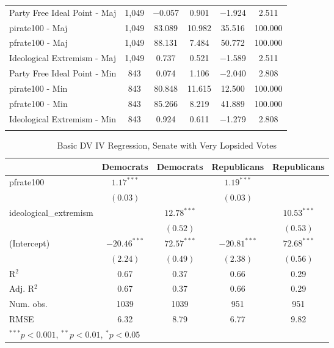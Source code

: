 \documentclass[12pt]{article}
\begin{document}
\begin{table}[!htbp]
\begin{tabular}{@{\extracolsep{5pt}}lccccc}
		\hline
		Party Free Ideal Point - Maj & 1,049 & $-$0.057 & 0.901 & $-$1.924 & 2.511 \\ 
		pirate100 - Maj & 1,049 & 83.089 & 10.982 & 35.516 & 100.000 \\ 
		pfrate100 - Maj & 1,049 & 88.131 & 7.484 & 50.772 & 100.000 \\ 
		Ideological Extremism - Maj & 1,049 & 0.737 & 0.521 & $-$1.589 & 2.511 \\ 
		\hline
		Party Free Ideal Point - Min & 843 & 0.074 & 1.106 & $-$2.040 & 2.808 \\ 
		pirate100 - Min & 843 & 80.848 & 11.615 & 12.500 & 100.000 \\ 
		pfrate100 - Min & 843 & 85.266 & 8.219 & 41.889 & 100.000 \\ 
		Ideological Extremism - Min & 843 & 0.924 & 0.611 & $-$1.279 & 2.808 \\ 
		\hline \\[-1.8ex] 
	\end{tabular} 
\end{table} 

\begin{table}
	\begin{center}
		\caption{Basic DV IV Regression, Senate with Very Lopsided Votes}
		\begin{tabular}{l c c c c }
			\hline
			& Democrats & Democrats & Republicans & Republicans \\
			\hline
			pfrate100              & $1.17^{***}$   &               & $1.19^{***}$   &               \\
			& $(0.03)$       &               & $(0.03)$       &               \\
			ideological\_extremism &                & $12.78^{***}$ &                & $10.53^{***}$ \\
			&                & $(0.52)$      &                & $(0.53)$      \\
			(Intercept)            & $-20.46^{***}$ & $72.57^{***}$ & $-20.81^{***}$ & $72.68^{***}$ \\
			& $(2.24)$       & $(0.49)$      & $(2.38)$       & $(0.56)$      \\
			\hline
			R$^2$                  & 0.67           & 0.37          & 0.66           & 0.29          \\
			Adj. R$^2$             & 0.67           & 0.37          & 0.66           & 0.29          \\
			Num. obs.              & 1039           & 1039          & 951            & 951           \\
			RMSE                   & 6.32           & 8.79          & 6.77           & 9.82          \\
			\hline
			\multicolumn{5}{l}{\scriptsize{$^{***}p<0.001$, $^{**}p<0.01$, $^*p<0.05$}}
		\end{tabular}
	\end{center}
\end{table}
\end{document}
